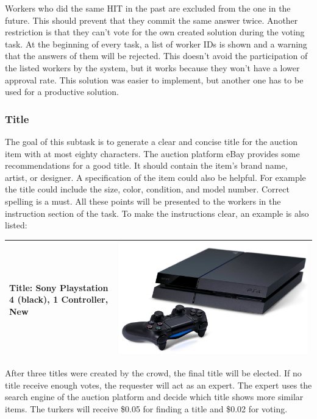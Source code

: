 Workers who did the same HIT in the past are excluded from the one in the future. This should prevent that they commit the same answer twice. Another restriction is that they can't vote for the own created solution during the voting task. At the beginning of every task, a list of worker IDs is shown and a warning that the answers of them will be rejected. This doesn't avoid the participation of the listed workers by the system, but it works because they won't have a lower approval rate. This solution was easier to implement, but another one has to be used for a productive solution.
\subsubsection{Title}
The goal of this subtask is to generate a clear and concise title for the auction item with at most eighty characters. The auction platform eBay provides some recommendations for a good title. It should contain the item's brand name, artist, or designer. A specification of the item could also be helpful. For example the title could include the size, color, condition, and model number. Correct spelling is a must. All these points will be presented to the workers in the instruction section of the task. To make the instructions clear, an example is also listed:
\begin{table}[h!]
	\begin{center}
	\begin{tabular}{| p{8.5cm} p{4.5cm} |}
		\hline
		Title: Sony Playstation 4 (black), 1 Controller, New & \includegraphics[scale=0.07]{images/ps4} \\
		\hline
	\end{tabular}
	\end{center}
\end{table}
\clearpage
After three titles were created by the crowd, the final title will be elected. If no title receive enough votes, the requester will act as an expert. The expert uses the search engine of the auction platform and decide which title shows more similar items. The turkers will receive \$0.05 for finding a title and \$0.02 for voting.
